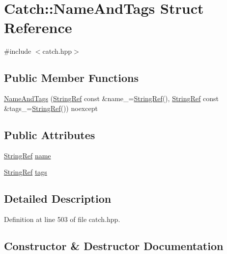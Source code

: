 \hypertarget{struct_catch_1_1_name_and_tags}{}\section{Catch\+:\+:Name\+And\+Tags Struct Reference}
\label{struct_catch_1_1_name_and_tags}


{\ttfamily \#include $<$catch.\+hpp$>$}

\subsection*{Public Member Functions}
\begin{DoxyCompactItemize}
\item 
\mbox{\hyperlink{struct_catch_1_1_name_and_tags_ab585111e615ce8c504a2b9630de8ee94}{Name\+And\+Tags}} (\mbox{\hyperlink{class_catch_1_1_string_ref}{String\+Ref}} const \&name\+\_\+=\mbox{\hyperlink{class_catch_1_1_string_ref}{String\+Ref}}(), \mbox{\hyperlink{class_catch_1_1_string_ref}{String\+Ref}} const \&tags\+\_\+=\mbox{\hyperlink{class_catch_1_1_string_ref}{String\+Ref}}()) noexcept
\end{DoxyCompactItemize}
\subsection*{Public Attributes}
\begin{DoxyCompactItemize}
\item 
\mbox{\hyperlink{class_catch_1_1_string_ref}{String\+Ref}} \mbox{\hyperlink{struct_catch_1_1_name_and_tags_a7cbea60e0cebfa622c667008eb011420}{name}}
\item 
\mbox{\hyperlink{class_catch_1_1_string_ref}{String\+Ref}} \mbox{\hyperlink{struct_catch_1_1_name_and_tags_a74062ed1138834a348424eb7ed900c57}{tags}}
\end{DoxyCompactItemize}


\subsection{Detailed Description}


Definition at line 503 of file catch.\+hpp.



\subsection{Constructor \& Destructor Documentation}
\mbox{\label{struct_catch_1_1_name_and_tags_ab585111e615ce8c504a2b9630de8ee94}} 
